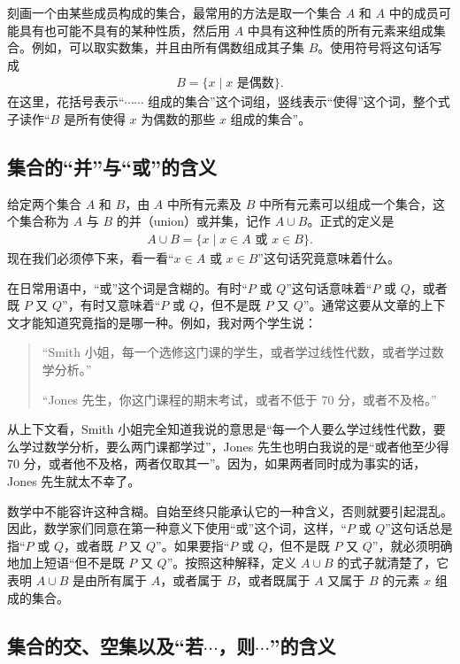 \documentclass[../../main.tex]{subfiles}
\begin{document}
刻画一个由某些成员构成的集合，最常用的方法是取一个集合 $A$ 和 $A$ 中的成员可能具有也可能不具有的某种性质，然后用 $A$ 中具有这种性质的所有元素来组成集合。例如，可以取实数集，并且由所有偶数组成其子集 $B$。使用符号将这句话写成
\begin{align*}
B = \{x \mid x \text{ 是偶数}\}.
\end{align*}
在这里，花括号表示“$\cdots\cdots$ 组成的集合”这个词组，竖线表示“使得”这个词，整个式子读作“$B$ 是所有使得 $x$ 为偶数的那些 $x$ 组成的集合”。

\subsection*{集合的“并”与“或”的含义}

给定两个集合 $A$ 和 $B$，由 $A$ 中所有元素及 $B$ 中所有元素可以组成一个集合，这个集合称为 $A$ 与 $B$ 的并（union）或并集，记作 $A \cup B$。正式的定义是
\begin{align}
A \cup B = \{x \mid x \in A \text{ 或 } x \in B\}.\label{align:ch01-并定义}
\end{align}
现在我们必须停下来，看一看“$x \in A$ 或 $x \in B$”这句话究竟意味着什么。

在日常用语中，“或”这个词是含糊的。有时“$P$ 或 $Q$”这句话意味着“$P$ 或 $Q$，或者既 $P$ 又 $Q$”，有时又意味着“$P$ 或 $Q$，但不是既 $P$ 又 $Q$”。通常这要从文章的上下文才能知道究竟指的是哪一种。例如，我对两个学生说：

\begin{quote}
“Smith 小姐，每一个选修这门课的学生，或者学过线性代数，或者学过数学分析。”

“Jones 先生，你这门课程的期末考试，或者不低于 $70$ 分，或者不及格。”
\end{quote}

从上下文看，Smith 小姐完全知道我说的意思是“每一个人要么学过线性代数，要么学过数学分析，要么两门课都学过”，Jones 先生也明白我说的是“或者他至少得 $70$ 分，或者他不及格，两者仅取其一”。因为，如果两者同时成为事实的话，Jones 先生就太不幸了。

数学中不能容许这种含糊。自始至终只能承认它的一种含义，否则就要引起混乱。因此，数学家们同意在第一种意义下使用“或”这个词，这样，“$P$ 或 $Q$”这句话总是指“$P$ 或 $Q$，或者既 $P$ 又 $Q$”。如果要指“$P$ 或 $Q$，但不是既 $P$ 又 $Q$”，就必须明确地加上短语“但不是既 $P$ 又 $Q$”。按照这种解释，定义 $A \cup B$ 的式子就清楚了，它表明 $A \cup B$ 是由所有属于 $A$，或者属于 $B$，或者既属于 $A$ 又属于 $B$ 的元素 $x$ 组成的集合。

\subsection*{集合的交、空集以及“若$\cdots$，则$\cdots$”的含义}
\end{document}
